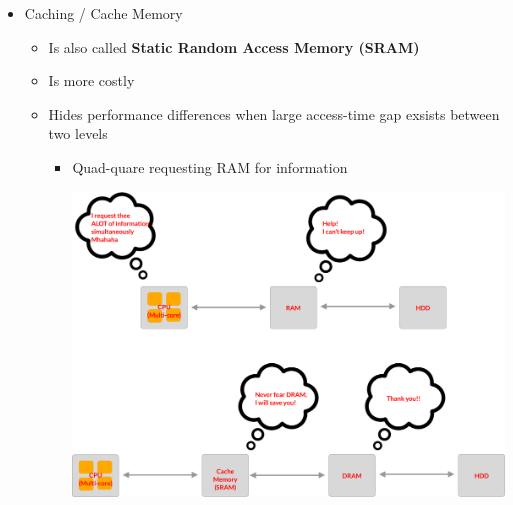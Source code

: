 \documentclass[12pt]{article}
\begin{document}
\begin{itemize}
    \item Caching / Cache Memory

    \begin{itemize}
        \item Is also called \textbf{Static Random Access Memory (SRAM)}
        \item Is more costly
        \item Hides performance differences when large access-time gap exsists
        between two levels
        \begin{itemize}
            \item Quad-quare requesting RAM for information

            \begin{center}
            \includegraphics[width=\linewidth]{images/week_1_notes_1_4.png}
            \end{center}


\end{itemize}
\end{itemize}
\end{itemize}
\end{document}
